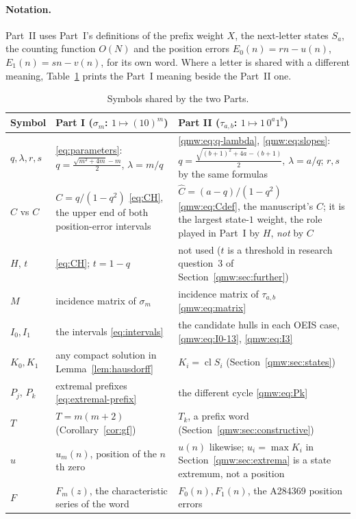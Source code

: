 \documentclass[11pt]{article}
\numberwithin{equation}{section}
\theoremstyle{definition}
\theoremstyle{remark}
\newcommand{\cl}{\operatorname{cl}}
\begin{document}
\paragraph{Notation.} Part~II uses Part~I's definitions of the prefix weight
$X$, the next-letter states $S_a$, the counting function $O(N)$ and the
position errors $E_0(n)=rn-u(n)$, $E_1(n)=sn-v(n)$, for its own word. Where a
letter is shared with a different meaning, Table~\ref{qmw:tab:notation}
prints the Part~I meaning beside the Part~II one.

\begin{table}[htbp]
\centering\small
\caption{Symbols shared by the two Parts.}\label{qmw:tab:notation}
\begin{tabular}{>{\raggedright\arraybackslash}p{}>{\raggedright\arraybackslash}p{}>{\raggedright\arraybackslash}p{}}
\toprule
Symbol & Part I ($\sigma_m$: $1\mapsto(10)^m$) & Part II ($\tau_{a,b}$: $1\mapsto1\,0^a1^b$)\\
\midrule
$q,\lambda,r,s$ & \eqref{eq:parameters}: $q=\frac{\sqrt{m^2+4m}-m}2$, $\lambda=m/q$ & \eqref{qmw:eq:q-lambda}, \eqref{qmw:eq:slopes}: $q=\frac{\sqrt{(b+1)^2+4a}-(b+1)}2$, $\lambda=a/q$; $r,s$ by the same formulas\\
$\widehat C$ vs $C$ & $C=q/(1-q^2)$ \eqref{eq:CH}, the upper end of both position-error intervals & $\widehat C=(a-q)/(1-q^2)$ \eqref{qmw:eq:Cdef}, the manuscript's $C$; it is the largest state-$1$ weight, the role played in Part~I by $H$, \emph{not} by $C$\\
$H$, $t$ & \eqref{eq:CH}; $t=1-q$ & not used ($t$ is a threshold in research question~3 of Section~\ref{qmw:sec:further})\\
$M$ & incidence matrix of $\sigma_m$ & incidence matrix of $\tau_{a,b}$ \eqref{qmw:eq:matrix}\\
$I_0,I_1$ & the intervals \eqref{eq:intervals} & the candidate hulls in each OEIS case, \eqref{qmw:eq:I0-13}, \eqref{qmw:eq:I3}\\
$K_0,K_1$ & any compact solution in Lemma~\ref{lem:hausdorff} & $K_i=\cl S_i$ (Section~\ref{qmw:sec:states})\\
$P_j$, $P_k$ & extremal prefixes \eqref{eq:extremal-prefix} & the different cycle \eqref{qmw:eq:Pk}\\
$T$ & $T=m(m+2)$ (Corollary~\ref{cor:gf}) & $T_k$, a prefix word (Section~\ref{qmw:sec:constructive})\\
$u$ & $u_m(n)$, position of the $n$th zero & $u(n)$ likewise; $u_i=\max K_i$ in Section~\ref{qmw:sec:extrema} is a state extremum, not a position\\
$F$ & $F_m(z)$, the characteristic series of the word & $F_0(n),F_1(n)$, the A284369 position errors\\
\bottomrule
\end{tabular}
\end{table}
\end{document}
